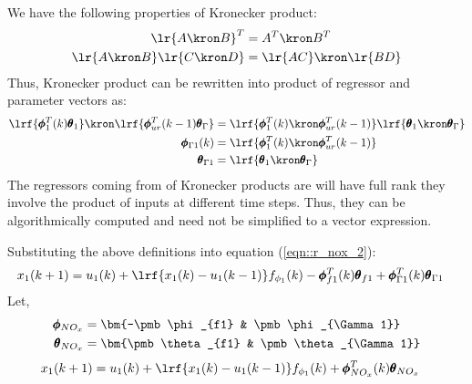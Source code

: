 We have the following properties of Kronecker product:
        \begin{align*}
                \lr{A \kron B}^T &= A^T \kron B^T \\
                \lr{A \kron B} \lr{C \kron D} &= \lr{AC} \kron \lr{BD}
        \end{align*}
Thus, Kronecker product can be rewritten into product of regressor and parameter vectors as:
\begin{align*}
        \lrf{\pmb \phi_1^T(k) \pmb \theta_1} \kron \lrf{\pmb \phi^T_{ur}(k-1) \pmb \theta_\Gamma} &=
             \lrf{ \pmb \phi_1^T(k) \kron \pmb \phi^T_{ur}(k-1) }
             \lrf{\pmb \theta_1 \kron \pmb \theta_\Gamma}\\
        \pmb \phi_{\Gamma 1} (k) &= \lrf{ \pmb \phi_1^T(k) \kron \pmb \phi^T_{ur}(k-1) } \\
        \pmb \theta_{\Gamma 1} &= \lrf{\pmb \theta_1 \kron \pmb \theta_\Gamma}
\end{align*}
The regressors coming from  of Kronecker products are will have full rank they involve the product of inputs at different time steps. Thus, they can be algorithmically computed and need not be simplified to a vector expression.

Substituting the above definitions into equation (\ref{eqn::r_nox_2}):
\begin{align}
         x_1(k+1) &=  u_1(k)  + \lrf{{x_1(k) - u_1(k-1)}} f_{\phi_1}(k) -
                     \pmb \phi_{f1}^T(k) \pmb \theta_{f1} +
                     \pmb \phi_{\Gamma 1}^T(k) \pmb \theta_{\Gamma 1}
        \label{eqn::r_nox_3}
\end{align}
Let,
\begin{align}
        \pmb \phi_{NO_x} &= \bm{-\pmb \phi_{f1} & \pmb \phi_{\Gamma 1}}\\
        \pmb \theta_{NO_x} &= \bm{\pmb \theta_{f1} & \pmb \theta_{\Gamma 1}}
\end{align}
\begin{align}
          x_1(k+1) &=  u_1(k)  + \lrf{{x_1(k) - u_1(k-1)}} f_{\phi_1}(k) +
                     \pmb \phi_{NO_x}^T (k) \pmb \theta_{NO_x}
        \label{eqn::r_nox_regression}
\end{align}




